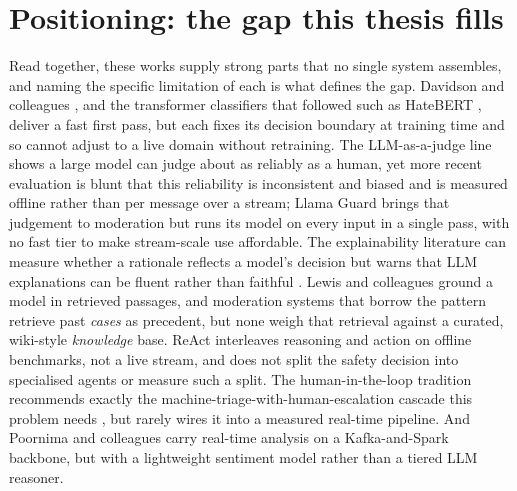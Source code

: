 \section{Positioning: the gap this thesis fills}\label{positioning-the-gap-this-thesis-fills}

Read together, these works supply strong parts that no single system assembles, and naming the specific limitation of each is what defines the gap. Davidson and colleagues \citep{davidson2017}, and the transformer classifiers that followed such as HateBERT \citep{hatebert2021}, deliver a fast first pass, but each fixes its decision boundary at training time and so cannot adjust to a live domain without retraining. The LLM-as-a-judge line \citep{llmjudge2023} shows a large model can judge about as reliably as a human, yet more recent evaluation is blunt that this reliability is inconsistent and biased \citep{judgereliability2026, judgebias2026} and is measured offline rather than per message over a stream; Llama Guard \citep{llamaguard2023} brings that judgement to moderation but runs its model on every input in a single pass, with no fast tier to make stream-scale use affordable. The explainability literature can measure whether a rationale reflects a model's decision \citep{deyoung2020eraser} but warns that LLM explanations can be fluent rather than faithful \citep{turpin2023unfaithful}. Lewis and colleagues \citep{rag2020} ground a model in retrieved passages, and moderation systems that borrow the pattern retrieve past \emph{cases} as precedent, but none weigh that retrieval against a curated, wiki-style \emph{knowledge} base. ReAct \citep{react2023} interleaves reasoning and action on offline benchmarks, not a live stream, and does not split the safety decision into specialised agents or measure such a split. The human-in-the-loop tradition recommends exactly the machine-triage-with-human-escalation cascade this problem needs \citep{chandrasekharan2019crossmod, escalate2026}, but rarely wires it into a measured real-time pipeline. And Poornima and colleagues \citep{poornima2025} carry real-time analysis on a Kafka-and-Spark backbone, but with a lightweight sentiment model rather than a tiered LLM reasoner.

